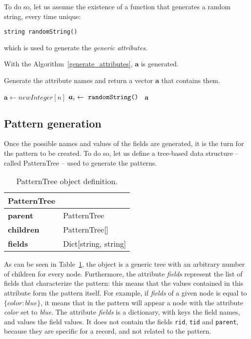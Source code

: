 \documentclass{acm_proc_article-sp-sigmod09}
\begin{document}
To do so, let us assume the existence of a function that generates a random string, every time unique:
\begin{verbatim}
string randomString()
\end{verbatim}
which is used to generate the \emph{generic attributes}.

With the Algorithm~\ref{generate_attributes}, $\boldsymbol{a}$ is generated.
\begin{algorithm}
\caption{Generate the attribute names and return a vector $\boldsymbol{a}$ that contains them.}
\label{generate_attributes}
\begin{algorithmic}[1]
\State $\boldsymbol{a} \gets new Integer[n]$
	\State $\boldsymbol{a}_i \gets \text{ \texttt{randomString() }} $ 
\EndFor
\Return $\boldsymbol{a}$
\EndFunction
\end{algorithmic}
\end{algorithm}

\subsection{Pattern generation}
Once the possible names and values of the fields are generated, it is the turn for the pattern to be created. To do so, let us define a tree-based data structure -- called PatternTree -- used to generate the patterns.

\begin{table}[H]
\centering
\begin{tabular}{|ll|} \hline
\textbf{PatternTree} & \\ \hline
\textbf{parent} & PatternTree \\ \hline
\textbf{children} & PatternTree[] \\ \hline
\textbf{fields} & Dict[string, string] \\
\hline\end{tabular}
\caption{PatternTree object definition.}
\label{tab:patterntree}
\end{table}

As can be seen in Table~\ref{tab:patterntree}, the object is a generic tree with an arbitrary number of children for every node. Furthermore, the attribute \emph{fields} represent the list of fields that characterize the pattern: this means that the values contained in this attribute form the pattern itself. For example, if \emph{fields} of a given node is equal to $ \{ color : blue \} $, it means that in the pattern will appear a node with the attribute \emph{color} set to \emph{blue}. The attribute \emph{fields} is a dictionary, with keys the field names, and values the field values. It does not contain the fields \texttt{rid}, \texttt{tid} and \texttt{parent}, because they are specific for a record, and not related to the pattern.
\end{document}
